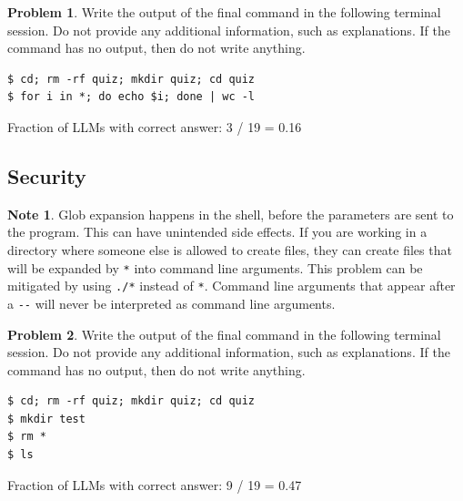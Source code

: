 \documentclass[10pt]{article}
\theoremstyle{definition}
\newtheorem{problem}{Problem}
\newtheorem{note}{Note}
\begin{document}
\noindent\vspace{0.1in}\begin{minipage}{\textwidth}

\begin{problem}
Write the output of the final command in the following terminal session.
Do not provide any additional information,
such as explanations.
If the command has no output,
then do not write anything.

\end{problem}
\begin{lstlisting}
$ cd; rm -rf quiz; mkdir quiz; cd quiz
$ for i in *; do echo $i; done | wc -l
\end{lstlisting}

Fraction of LLMs with correct answer: 3 / 19 = 0.16
\end{minipage}
\noindent\vspace{0.1in}\begin{minipage}{\textwidth}
\subsection{Security}

\begin{note}
Glob expansion happens in the shell,
before the parameters are sent to the program.
This can have unintended side effects.
If you are working in a directory where someone else is allowed to create files,
they can create files that will be expanded by \lstinline{*} into command line arguments.
This problem can be mitigated by using \lstinline{./*} instead of \lstinline{*}.
Command line arguments that appear after a \lstinline{--} will never be interpreted as command line arguments.

\end{note}

\end{minipage}
\noindent\vspace{0.1in}\begin{minipage}{\textwidth}

\begin{problem}
Write the output of the final command in the following terminal session.
Do not provide any additional information,
such as explanations.
If the command has no output,
then do not write anything.

\end{problem}
\begin{lstlisting}
$ cd; rm -rf quiz; mkdir quiz; cd quiz
$ mkdir test
$ rm *
$ ls
\end{lstlisting}

Fraction of LLMs with correct answer: 9 / 19 = 0.47
\end{minipage}
\end{document}
